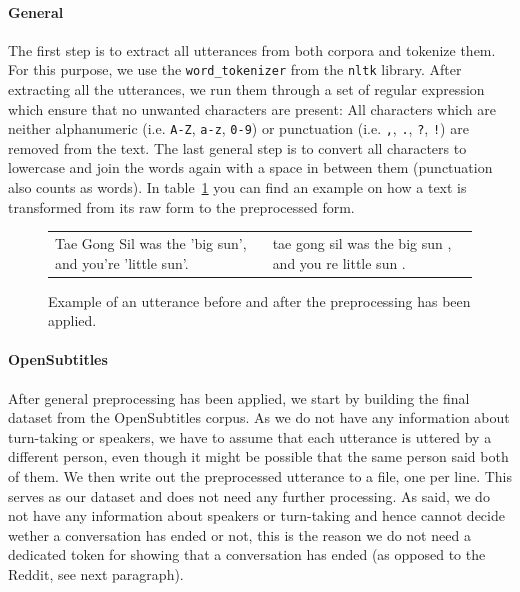 \paragraph{General} The first step is to extract all utterances from both corpora and tokenize them. For this purpose, we use the \texttt{word\_tokenizer} from the \texttt{nltk} library. After extracting all the utterances, we run them through a set of regular expression which ensure that no unwanted characters are present: All characters which are neither alphanumeric (i.e. \texttt{A-Z}, \texttt{a-z}, \texttt{0-9}) or punctuation (i.e. \texttt{,}, \texttt{.}, \texttt{?}, \texttt{!}) are removed from the text. The last general step is to convert all characters to lowercase and join the words again with a space in between them (punctuation also counts as words). In table~\ref{data:preprocessing:table_after_preprocessing} you can find an example on how a text is transformed from its raw form to the preprocessed form.
\\
\begin{figure}[h]
	\centering
	\begin{adjustbox}{max width=\textwidth}
		\begin{tabular}{ll}
			\toprule
			\specialcell{Raw Utterance} & \specialcell{Preprocessed Utterance}\\
			\midrule
			Tae Gong Sil was the 'big sun', and you're 'little sun'. & tae gong sil was the big sun , and you re little sun . \\
			\bottomrule
		\end{tabular}
	\end{adjustbox}
	\caption{Example of an utterance before and after the preprocessing has been applied.}
	\label{data:preprocessing:table_after_preprocessing}
\end{figure}

\paragraph{OpenSubtitles} After general preprocessing has been applied, we start by building the final dataset from the OpenSubtitles corpus. As we do not have any information about turn-taking or speakers, we have to assume that each utterance is uttered by a different person, even though it might be possible that the same person said both of them. We then write out the preprocessed utterance to a file, one per line. This serves as our dataset and does not need any further processing. As said, we do not have any information about speakers or turn-taking and hence cannot decide wether a conversation has ended or not, this is the reason we do not need a dedicated token for showing that a conversation has ended (as opposed to the Reddit, see next paragraph).

